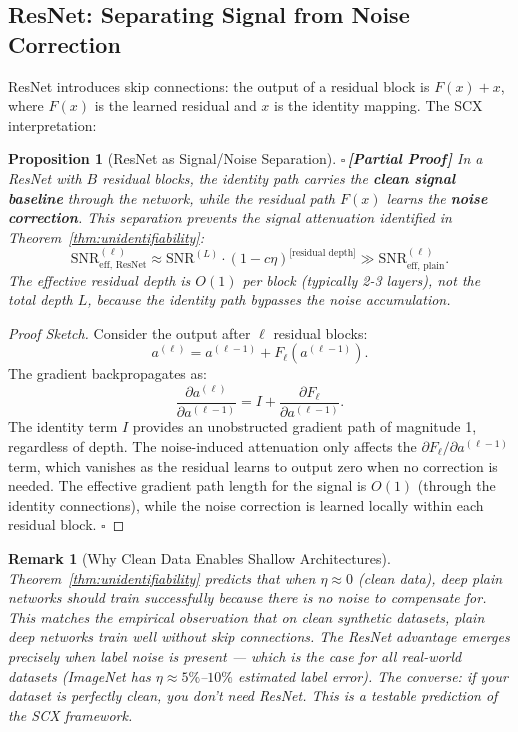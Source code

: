 \documentclass[12pt,a4paper]{article}
\newtheorem{proposition}[theorem]{Proposition}
\newtheorem{remark}[theorem]{Remark}
\theoremstyle{definition}
\newcommand{\rigorPartial}{{\color{rigorcolor}$\square$\,\textbf{[Partial Proof]}}}
\newcommand{\SCX}{\textsc{SCX}}
\begin{document}
\subsection{ResNet: Separating Signal from Noise Correction}

ResNet introduces skip connections: the output of a residual block is $F(x) + x$, where $F(x)$ is the learned residual and $x$ is the identity mapping. The \SCX{} interpretation:

\begin{proposition}[ResNet as Signal/Noise Separation]\label{prop:resnet_separation}
\rigorPartial
In a ResNet with $B$ residual blocks, the identity path carries the \textbf{clean signal baseline} through the network, while the residual path $F(x)$ learns the \textbf{noise correction}. This separation prevents the signal attenuation identified in Theorem~\ref{thm:unidentifiability}:
\begin{equation}\label{eq:resnet_snr}
    \text{SNR}_{\text{eff, ResNet}}^{(\ell)} \approx \text{SNR}^{(L)} \cdot (1 - c\eta)^{\text{[residual depth]}} \gg \text{SNR}_{\text{eff, plain}}^{(\ell)}.
\end{equation}
The effective residual depth is $O(1)$ per block (typically 2-3 layers), not the total depth $L$, because the identity path bypasses the noise accumulation.
\end{proposition}

\begin{proof}[Proof Sketch]
Consider the output after $\ell$ residual blocks:
\begin{equation}
    a^{(\ell)} = a^{(\ell-1)} + F_\ell(a^{(\ell-1)}).
\end{equation}
The gradient backpropagates as:
\begin{equation}
    \frac{\partial a^{(\ell)}}{\partial a^{(\ell-1)}} = I + \frac{\partial F_\ell}{\partial a^{(\ell-1)}}.
\end{equation}
The identity term $I$ provides an unobstructed gradient path of magnitude 1, regardless of depth. The noise-induced attenuation only affects the $\partial F_\ell / \partial a^{(\ell-1)}$ term, which vanishes as the residual learns to output zero when no correction is needed. The effective gradient path length for the signal is $O(1)$ (through the identity connections), while the noise correction is learned locally within each residual block. \hfill $\square$
\end{proof}

\begin{remark}[Why Clean Data Enables Shallow Architectures]
Theorem~\ref{thm:unidentifiability} predicts that when $\eta \approx 0$ (clean data), deep plain networks should train successfully because there is no noise to compensate for. This matches the empirical observation that on clean synthetic datasets, plain deep networks train well without skip connections. The ResNet advantage emerges precisely when label noise is present — which is the case for all real-world datasets (ImageNet has $\eta \approx 5\%$–$10\%$ estimated label error). The converse: if your dataset is perfectly clean, you don't need ResNet. This is a testable prediction of the \SCX{} framework.
\end{remark}
\end{document}
